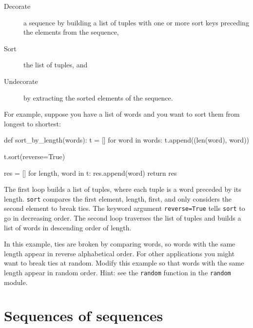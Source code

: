 \begin{description}

\item[Decorate] a sequence by building a list of tuples
with one or more sort keys preceding the elements from the sequence,

\item[Sort] the list of tuples, and

\item[Undecorate] by extracting the sorted elements of the sequence.

\end{description}

\label{DSU}

For example, suppose you have a list of words and you want to
sort them from longest to shortest:

\beforeverb
\begin{pycode}
def sort_by_length(words):
    t = []
    for word in words:
       t.append((len(word), word))

    t.sort(reverse=True)

    res = []
    for length, word in t:
        res.append(word)
    return res
\end{pycode}
\afterverb
%
The first loop builds a list of tuples, where each
tuple is a word preceded by its length.
%
{\tt sort} compares the first element, length, first, and
only considers the second element to break ties.  The keyword argument
{\tt reverse=True} tells {\tt sort} to go in decreasing order.
%
%
The second loop traverses the list of tuples and builds a list of
words in descending order of length.

\begin{exercise}
In this example, ties are broken by comparing words, so words
with the same length appear in reverse alphabetical order.  For other
applications you might want to break ties at random.  Modify
this example so that words with the same length appear in
random order.  Hint: see the {\tt random} function in the
{\tt random} module.


\end{exercise}


\section{Sequences of sequences}

